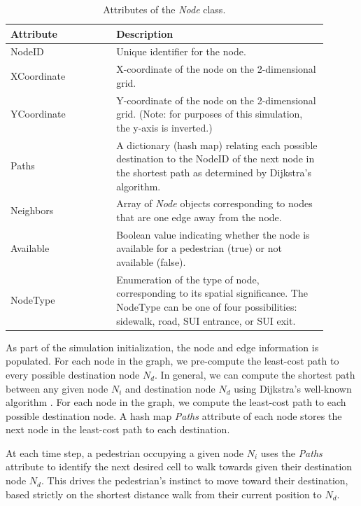 \documentclass[12pt]{article}
\begin{document}
\def\arraystretch{1.5}
\begin{table}[hb!]
  \centering
    \begin{tabular}{p{0.3\linewidth}p{0.6\linewidth}}
     \hline
     Attribute & Description \\
     \hline
     NodeID      & Unique identifier for the node. \\
     XCoordinate & X-coordinate of the node on the 2-dimensional grid. \\
     YCoordinate & Y-coordinate of the node on the 2-dimensional grid.
                   (Note: for purposes of this simulation, the y-axis is
                    inverted.) \\
     Paths       & A dictionary (hash map) relating each possible destination
                   to the NodeID of the next node in the shortest path as
                   determined by Dijkstra's algorithm. \\
     Neighbors & Array of \textit{Node} objects corresponding to nodes that are
                 one edge away from the node. \\
     Available	& Boolean value indicating whether the node is available for a
                  pedestrian (true) or not available (false). \\
     NodeType   & Enumeration of the type of node, corresponding to its
                  spatial significance. The NodeType can be one of four
                  possibilities: sidewalk, road, SUI entrance, or SUI exit. \\
     \hline
    \end{tabular}
    \caption{Attributes of the \textit{Node} class.}
  \label{table:node}
\end{table}

As part of the simulation initialization, the node and edge information is
populated. For each node in the graph, we pre-compute the least-cost path to
every possible destination node $N_d$. In general, we can compute the shortest
path between any given node $N_i$ and destination node $N_d$ using Dijkstra's
well-known algorithm \cite{dijkstra1959note}. For each node in the graph, we
compute the least-cost path to each possible destination node. A hash map
\textit{Paths} attribute of each node stores the next node in the least-cost
path to each destination.

At each time step, a pedestrian occupying a given node $N_i$ uses the
\textit{Paths} attribute to identify the next desired cell to walk towards given
their destination node $N_d$. This drives the pedestrian’s instinct to move
toward their destination, based strictly on the shortest distance walk from
their current position to $N_d$.
\end{document}

